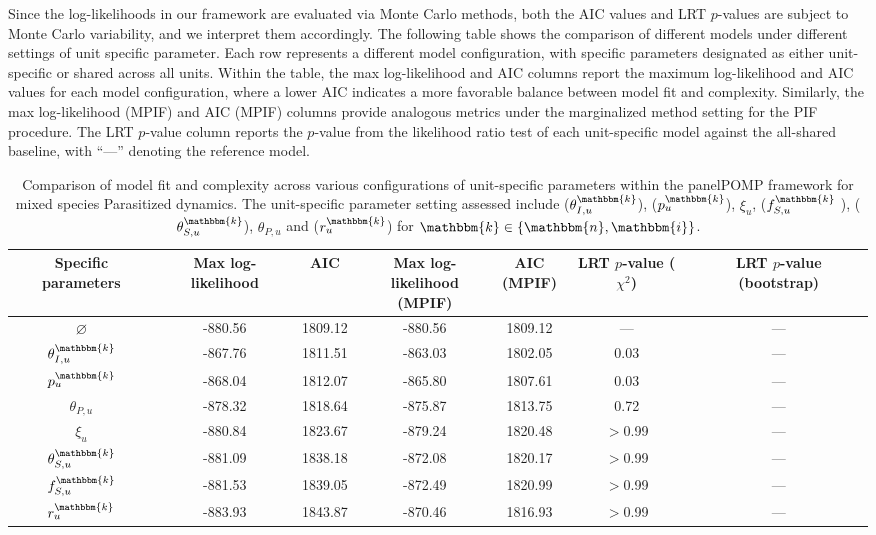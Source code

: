 \documentclass[aoas,preprint]{imsart}\usepackage[]{graphicx}\usepackage[]{xcolor}
\newcommand\unit{u}
\newcommand\species{\mathbbm{k}}
\newcommand\native{\mathbbm{n}}
\newcommand\invasive{\mathbbm{i}}
\begin{document}
Since the log-likelihoods in our framework are evaluated via Monte Carlo methods, both the AIC values and LRT $p$-values are subject to Monte Carlo variability, and we interpret them accordingly.
The following table shows the comparison of different models under different settings of unit specific parameter.
Each row represents a different model configuration, with specific parameters designated as either unit-specific or shared across all units.
Within the table, the max log-likelihood and AIC columns report the maximum log-likelihood and AIC values for each model configuration, where a lower AIC indicates a more favorable balance between model fit and complexity. Similarly, the max log-likelihood (MPIF) and AIC (MPIF) columns provide analogous metrics under the marginalized method setting for the PIF procedure. The LRT $p$-value column reports the $p$-value from the likelihood ratio test of each unit-specific model against the all-shared baseline, with ``---'' denoting the reference model.
\begin{table}[h!]
\centering
\small
\begin{center}
\begin{tabular}{||c |c |c |c|c|c|c||}
 \hline
Specific parameters  & Max log-likelihood & AIC & \makecell[c]{Max log-likelihood\\(MPIF)} & \makecell[c]{AIC\\(MPIF)} & \makecell[c]{LRT\\$p$-value\\($\chi^2$)} & \makecell[c]{LRT\\$p$-value\\(bootstrap)}\\ [0.5ex]
 \hline\hline
$\varnothing$ & -880.56& 1809.12& -880.56& 1809.12 & --- & --- \\
$\theta^{\species}_{I,\unit}$ & -867.76& 1811.51& -863.03& 1802.05 & 0.03 & --- \\
$p^{\species}_{\unit}$ & -868.04& 1812.07& -865.80& 1807.61 & 0.03 & --- \\
$\theta_{P,\unit}$ & -878.32& 1818.64& -875.87& 1813.75 & 0.72 & --- \\
$\xi_{\unit}$ & -880.84& 1823.67& -879.24& 1820.48 & $>$0.99 & --- \\
$\theta^{\species}_{S,\unit}$ & -881.09& 1838.18& -872.08& 1820.17 & $>$0.99 & --- \\
$f^{\species}_{S,\unit}$ & -881.53& 1839.05& -872.49& 1820.99 & $>$0.99 & --- \\
$r^{\species}_{\unit}$ & -883.93& 1843.87& -870.46& 1816.93 & $>$0.99 & --- \\[1ex]
 \hline
\end{tabular}
\end{center}
\caption{Comparison of model fit and complexity across various configurations of unit-specific parameters within the panelPOMP framework for mixed species Parasitized dynamics. The unit-specific parameter setting assessed include ($\theta^{\species}_{I,\unit}$), ($p^{\species}_{\unit}$), $\xi_{\unit}$, ($f^{\species}_{S,\unit}$ ), ($\theta^{\species}_{S,\unit}$), $\theta_{P,\unit}$ and ($r^{\species}_{\unit}$) for $\species \in \{\native,\invasive\}$.}
\label{Table:SIRJPF2_model_comparison}
\end{table}
\end{document}
